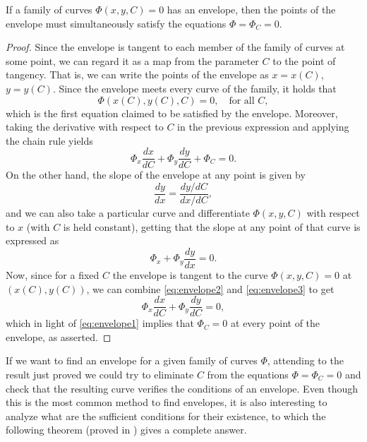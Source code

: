 \begin{theorem}
If a family of curves $\Phi(x,y,C)=0$ has an envelope, then the points of the envelope must simultaneously satisfy the equations $\Phi = \Phi_C=0$.
\end{theorem}

\begin{proof}
Since the envelope is tangent to each member of the family of curves at some point, we can regard it as a map from the parameter $C$ to the point of tangency. That is, we can write the points of the envelope as $x=x(C)$, $y=y(C)$. Since the envelope meets every curve of the family, it holds that
 \[
\Phi(x(C),y(C),C)=0, \quad \text{for all } C,
 \]
which is the first equation claimed to be satisfied by the envelope. Moreover, taking the derivative with respect to $C$ in the previous expression and applying the chain rule yields
\begin{equation} \label{eq:envelope1}
  \Phi_x \frac{dx}{dC} + \Phi_y \frac{dy}{dC} + \Phi_C = 0.
\end{equation}
 On the other hand, the slope of the envelope at any point is given by
 \begin{equation} \label{eq:envelope2}
   \frac{dy}{dx} = \frac{dy/dC}{dx/dC},
 \end{equation}
and we can also take a particular curve and differentiate $\Phi(x,y,C)$ with respect to $x$ (with $C$ is held constant), getting that the slope at any point of that curve is expressed as
\begin{equation} \label{eq:envelope3}
\Phi_x + \Phi_y \frac{dy}{dx} = 0.
\end{equation}
Now, since for a fixed $C$ the envelope is tangent to the curve $\Phi(x,y,C)=0$ at $(x(C),y(C))$, we can combine \eqref{eq:envelope2} and \eqref{eq:envelope3} to get
\[
\Phi_x \frac{dx}{dC} + \Phi_y \frac{dy}{dC} = 0,
\]
which in light of \eqref{eq:envelope1} implies that $\Phi_C=0$ at every point of the envelope, as asserted.
\end{proof}

If we want to find an envelope for a given family of curves $\Phi$, attending to the result just proved we could try to eliminate $C$ from the equations $\Phi=\Phi_C=0$ and check that the resulting curve verifies the conditions of an envelope. Even though this is the most common method to find envelopes, it is also interesting to analyze what are the sufficient conditions for their existence, to which the following theorem (proved in \cite[10]{burns1961envelopes}) gives a complete answer.

